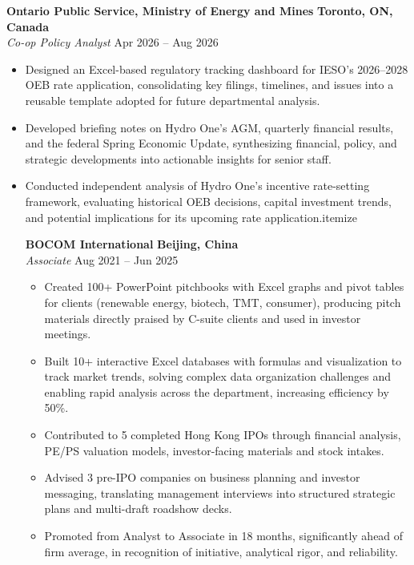 \documentclass[11pt]{article}
\begin{document}
\textbf{Ontario Public Service, Ministry of Energy and Mines} \hfill \textbf{Toronto, ON, Canada} \\
\textit{Co-op Policy Analyst} \hfill Apr 2026 -- Aug 2026
\begin{itemize}
    \item Designed an Excel-based regulatory tracking dashboard for IESO’s 2026–2028 OEB rate application, consolidating key filings, timelines, and issues into a reusable template adopted for future departmental analysis.
    \item Developed briefing notes on Hydro One’s AGM, quarterly financial results, and the federal Spring Economic Update, synthesizing financial, policy, and strategic developments into actionable insights for senior staff.
    \item Conducted independent analysis of Hydro One’s incentive rate-setting framework, evaluating historical OEB decisions, capital investment trends, and potential implications for its upcoming rate application.{itemize}

\vspace{4pt}

\textbf{BOCOM International} \hfill \textbf{Beijing, China} \\
\textit{Associate} \hfill Aug 2021 -- Jun 2025
\begin{itemize}
    \item Created 100+ PowerPoint pitchbooks with Excel	graphs and pivot tables	for	clients (renewable energy, biotech,	TMT, consumer),	producing pitch	materials directly	praised	by	C-suite	clients	and	used in	investor meetings.	
    \item Built	10+	interactive	Excel	databases	with	formulas	and	visualization	to	track	market	trends,	solving	complex	data organization challenges	and	enabling	rapid	analysis	across	the	department,	increasing	efficiency	by	50\%.
    \item Contributed	to	5	completed	Hong	Kong	IPOs	through	financial	analysis,	PE/PS	valuation	models,	investor-facing	materials and	stock	intakes.	
    \item Advised	3	pre-IPO	companies	on	business	planning	and	investor	messaging,	translating	management	interviews	into	
structured	strategic	plans	and	multi-draft	roadshow	decks.	
    \item Promoted	from	Analyst	to	Associate	in	18	months,	significantly	ahead	of	firm	average,	in	recognition	of	initiative,	
analytical	rigor,	and	reliability.	
\end{itemize}


\end{itemize}
\end{document}
